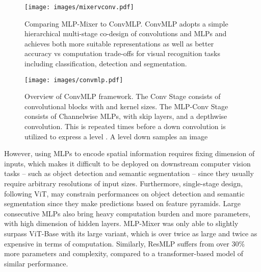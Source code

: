 \documentclass[final]{cvpr}
\begin{document}
\begin{figure}[htb]
\centering
\texttt{[image: images/mixervconv.pdf]}
\caption{Comparing MLP-Mixer to ConvMLP. ConvMLP adopts a simple hierarchical multi-stage co-design of convolutions and MLPs and achieves both more suitable representations as well as better accuracy vs computation trade-offs for visual recognition tasks including classification, detection and segmentation.}
\label{fig:mixerconvmlp}
\end{figure}

\begin{figure*}[htb]
\centering
\texttt{[image: images/convmlp.pdf]}
\caption{Overview of ConvMLP framework. The Conv Stage consists of  convolutional blocks with  and  kernel sizes. The MLP-Conv Stage consists of Channelwise MLPs, with skip layers, and a depthwise convolution. This is repeated  times before a down convolution is utilized to express a level . A level down samples an image }
\label{fig:overview}
\end{figure*}

However, using MLPs to encode spatial information requires fixing dimension of inputs, which makes it difficult to be deployed on downstream computer vision tasks -- such as object detection and semantic segmentation -- since they usually require arbitrary resolutions of input sizes. 
Furthermore, single-stage design, following ViT, may constrain performances on object detection and semantic segmentation since they make predictions based on feature pyramids. 
Large consecutive MLPs also bring heavy computation burden and more parameters, with high dimension of hidden layers. MLP-Mixer was only able to slightly surpass ViT-Base with its large variant, which is over twice as large and twice as expensive in terms of computation. Similarly, ResMLP suffers from over 30\% more parameters and complexity, compared to a transformer-based model of similar performance.
\end{document}

